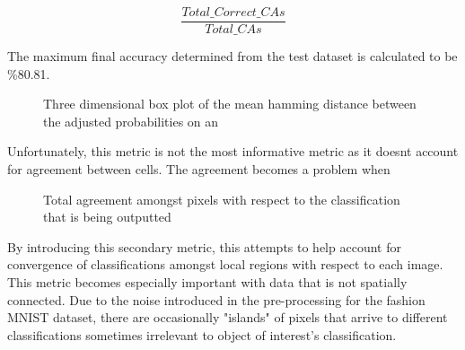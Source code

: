 \documentclass[conference]{IEEEtran}
\begin{document}
\begin{equation}
    \frac{Total\_Correct\_CAs} {Total\_CAs}
\end{equation}

The maximum final accuracy determined from the test dataset is calculated to be \%80.81.

\begin{figure}[htbp]
\caption{Three dimensional box plot of the mean hamming distance between the adjusted probabilities on an }
\end{figure}



Unfortunately, this metric is not the most informative metric as it doesnt account for agreement between cells. The agreement becomes a problem when 

\begin{figure}[htbp]
\caption{ Total agreement amongst pixels with respect to the classification that is being outputted}
\end{figure}

By introducing this secondary metric, this attempts to help account for convergence of classifications amongst local regions with respect to each image. This metric becomes especially important with data that is not spatially connected. Due to the noise introduced in the pre-processing for the fashion MNIST dataset, there are occasionally "islands" of pixels that arrive to different classifications sometimes irrelevant to object of interest's classification.
\end{document}
